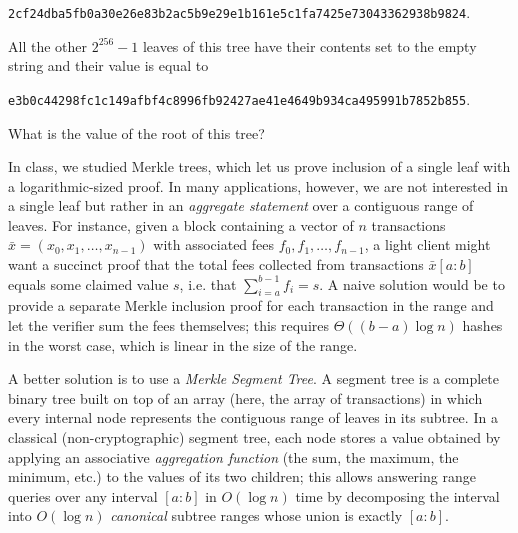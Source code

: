 \begin{problems}
          \texttt{2cf24dba5fb0a30e26e83b2ac5b9e29e1b161e5c1fa7425e73043362938b9824}.

          All the other $2^{256} - 1$ leaves of this tree have their contents
          set to the empty string and their value is equal to

          \texttt{e3b0c44298fc1c149afbf4c8996fb92427ae41e4649b934ca495991b7852b855}.

          What is the value of the root of this tree?

          \item In class, we studied Merkle trees, which let us prove inclusion of a single leaf
                with a logarithmic-sized proof. In many applications, however, we are not
                interested in a single leaf but rather in an \emph{aggregate statement} over a
                contiguous range of leaves. For instance, given a block containing a vector of
                $n$ transactions $\bar{x} = (x_0, x_1, \dots, x_{n-1})$ with associated fees
                $f_0, f_1, \dots, f_{n-1}$, a light client might want a succinct proof that the
                total fees collected from transactions $\bar{x}[a{:}b]$ equals some claimed
                value $s$, i.e. that $\sum_{i=a}^{b-1} f_i = s$. A naive solution would be to
                provide a separate Merkle inclusion proof for each transaction in the range and
                let the verifier sum the fees themselves; this requires $\Theta((b-a) \log n)$
                hashes in the worst case, which is linear in the size of the range.

                A better solution is to use a \emph{Merkle Segment Tree}. A segment tree is a
                complete binary tree built on top of an array (here, the array of transactions)
                in which every internal node represents the contiguous range of leaves in its
                subtree. In a classical (non-cryptographic) segment tree, each node stores a
                value obtained by applying an associative \emph{aggregation function} (the sum,
                the maximum, the minimum, etc.) to the values of its two children; this allows
                answering range queries over any interval $[a{:}b]$ in $O(\log n)$ time by
                decomposing the interval into $O(\log n)$ \emph{canonical} subtree ranges whose
                union is exactly $[a{:}b]$.


\end{problems}
